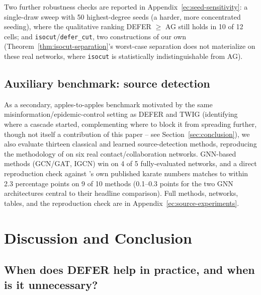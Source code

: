 \documentclass[ASNA,number]{USG}
\begin{document}
Two further robustness checks are reported in
Appendix~\ref{ec:seed-sensitivity}: a single-draw sweep with 50
highest-degree seeds (a harder, more concentrated seeding), where the
qualitative ranking DEFER $\ge$ AG still holds in 10 of 12 cells; and
\texttt{isocut}/\texttt{defer\_cut}, two constructions of our own
(Theorem~\ref{thm:isocut-separation}'s worst-case separation does not
materialize on these real networks, where \texttt{isocut} is
statistically indistinguishable from AG).

\subsection{Auxiliary benchmark: source detection}\label{sec:source-experiments}

As a secondary, apples-to-apples benchmark motivated by the same
misinformation/epidemic-control setting as DEFER and TWIG (identifying
where a cascade started, complementing where to block it from spreading
further, though not itself a contribution of this paper -- see
Section~\ref{sec:conclusion}), we also evaluate thirteen classical and
learned source-detection methods, reproducing the methodology of
\citet{sterchi2026} on six real contact/collaboration networks. GNN-based
methods (GCN/GAT, IGCN) win on 4 of 5 fully-evaluated networks, and a
direct reproduction check against \citet{sterchi2026}'s own published
karate numbers matches to within 2.3 percentage points on 9 of 10 methods
(0.1--0.3 points for the two GNN architectures central to their headline
comparison). Full methods, networks, tables, and the reproduction check
are in Appendix~\ref{ec:source-experiments}.

\section{Discussion and Conclusion}\label{sec:discussion}

\subsection{When does DEFER help in practice, and when is it unnecessary?}
\end{document}
